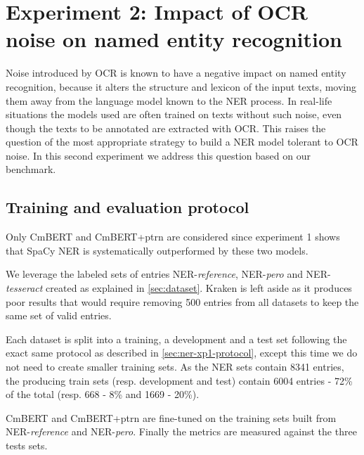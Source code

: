 \section{Experiment 2: Impact of OCR noise on named entity recognition}
\label{sec:ner-xp2}
Noise introduced by OCR is known to have a negative impact on named entity recognition, because it alters the structure and lexicon of the input texts, moving them away from the language model known to the NER process.
In real-life situations the models used are often trained on texts without such noise, even though the texts to be annotated are extracted with OCR.
This raises the question of the most appropriate strategy to build a NER model tolerant to OCR noise.
In this second experiment we address this question based on our benchmark.


\subsection{Training and evaluation protocol}
Only CmBERT and CmBERT+ptrn are considered since experiment 1 shows that SpaCy NER is systematically outperformed by these two models.

We leverage the labeled sets of entries NER-\emph{reference}, NER-\emph{pero} and NER-\emph{tesseract} created as explained in \cref{sec:dataset}.
Kraken is left aside as it produces poor results that would require removing 500 entries from all datasets to keep the same set of valid entries.

Each dataset is split into a training, a development and a test set following the exact same protocol as described in \cref{sec:ner-xp1-protocol}, except this time we do not need to create smaller training sets.
As the NER sets contain 8341 entries, the producing train sets (resp. development and test) contain 6004 entries - 72\% of the total (resp. 668 - 8\% and 1669 - 20\%).    

CmBERT and CmBERT+ptrn are fine-tuned on the training sets built from NER-\emph{reference} and NER-\emph{pero}.
Finally the metrics are measured against the three tests sets.






